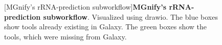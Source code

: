 \begin{figure}[H]
  \centering
  [MGnify's rRNA-prediction subworkflow]{\textbf{MGnify's rRNA-prediction subworkflow}. Visualized using drawio. The blue boxes show tools already existing in Galaxy. The green boxes show the tools, which were missing from Galaxy.} \label{fig:rRNA-prediction-subWF}%
\end{figure}

